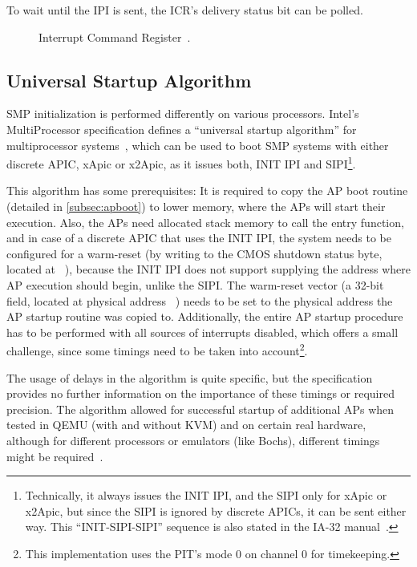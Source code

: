 To wait until the IPI is sent, the ICR's delivery status bit can be polled.

\begin{figure}[h]
  \centering
  \begin{subfigure}[b]{0.7\textwidth}
    
  \end{subfigure}
  \caption{Interrupt Command Register~\cite[sec.~3.11.6.1]{ia32}.}
  \label{fig:ia32icr}
\end{figure}

\subsection{Universal Startup Algorithm}
\label{subsec:apstartup}

SMP initialization is performed differently on various processors. Intel's MultiProcessor
specification defines a ``universal startup algorithm'' for multiprocessor
systems~\cite[sec.~B.4]{mpspec}, which can be used to boot SMP systems with either discrete APIC,
xApic or x2Apic, as it issues both, INIT IPI and SIPI\footnote{Technically, it always issues the
  INIT IPI, and the SIPI only for xApic or x2Apic, but since the SIPI is ignored by discrete APICs,
  it can be sent either way. This ``INIT-SIPI-SIPI'' sequence is also stated in the IA-32
  manual~\cite[sec.~3.9.4]{ia32}.}.

This algorithm has some prerequisites: It is required to copy the AP boot routine (detailed in
\autoref{subsec:apboot}) to lower memory, where the APs will start their execution. Also, the APs
need allocated stack memory to call the entry function, and in case of a discrete APIC that uses
the INIT IPI, the system needs to be configured for a warm-reset (by writing  to the
CMOS shutdown status byte, located at ~\cite[sec.~B.4]{mpspec}), because the INIT IPI
does not support supplying the address where AP execution should begin, unlike the SIPI. The
warm-reset vector (a 32-bit field, located at physical address
~\cite[sec.~B.4]{mpspec}) needs to be set to the physical address the AP startup
routine was copied to. Additionally, the entire AP startup procedure has to be performed with all
sources of interrupts disabled, which offers a small challenge, since some timings need to be taken
into account\footnote{This implementation uses the PIT's mode 0 on channel 0 for timekeeping.}.

The usage of delays in the algorithm is quite specific, but the specification provides no further
information on the importance of these timings or required precision. The algorithm allowed for
successful startup of additional APs when tested in QEMU (with and without KVM) and on certain real
hardware, although for different processors or emulators (like Bochs), different timings might be
required~\cite[lapic.c]{xv6}.

